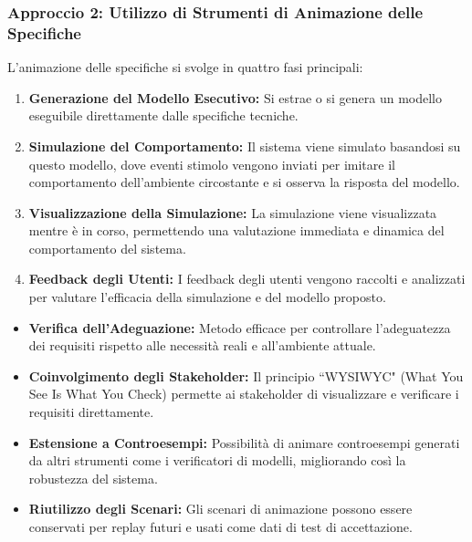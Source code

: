 \subsubsection{Approccio 2: Utilizzo di Strumenti di Animazione delle Specifiche}
L'animazione delle specifiche si svolge in quattro fasi principali:
\begin{enumerate}
    \item \textbf{Generazione del Modello Esecutivo:} Si estrae o si genera un 
    modello eseguibile direttamente dalle specifiche tecniche.
    \item \textbf{Simulazione del Comportamento:} Il sistema viene simulato 
    basandosi su questo modello, dove eventi stimolo vengono inviati per imitare 
    il comportamento dell'ambiente circostante e si osserva la risposta del modello.
    \item \textbf{Visualizzazione della Simulazione:} La simulazione viene 
    visualizzata mentre è in corso, permettendo una valutazione immediata e 
    dinamica del comportamento del sistema.
    \item \textbf{Feedback degli Utenti:} I feedback degli utenti vengono 
    raccolti e analizzati per valutare l'efficacia della simulazione e del 
    modello proposto.
\end{enumerate}
\begin{tcolorbox}[colback=green!5!white,colframe=green!75!black,title=Punti di Forza]
    \begin{itemize}
      \item \textbf{Verifica dell'Adeguazione:} Metodo efficace per controllare 
      l'adeguatezza dei requisiti rispetto alle necessità reali e all'ambiente attuale.
      \item \textbf{Coinvolgimento degli Stakeholder:} Il principio ``WYSIWYC" 
      (What You See Is What You Check) permette ai stakeholder di visualizzare e 
      verificare i requisiti direttamente.
      \item \textbf{Estensione a Controesempi:} Possibilità di animare controesempi 
      generati da altri strumenti come i verificatori di modelli, migliorando così la robustezza del sistema.
      \item \textbf{Riutilizzo degli Scenari:} Gli scenari di animazione possono 
      essere conservati per replay futuri e usati come dati di test di accettazione.
    \end{itemize}
    \end{tcolorbox}
    
